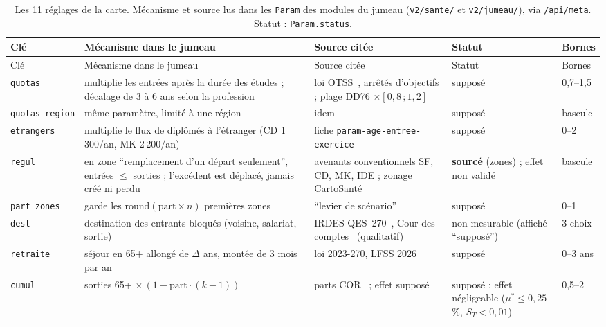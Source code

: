 \begin{small}
\begin{longtable}{@{}p{}p{}p{}p{}p{}@{}}
\caption{Les 11 réglages de la carte. Mécanisme et source lus dans les \texttt{Param} des modules du jumeau (\texttt{v2/\allowbreak{}sante/\allowbreak{}} et \texttt{v2/\allowbreak{}jumeau/\allowbreak{}}), via \texttt{/\allowbreak{}api/\allowbreak{}meta}. Statut : \texttt{Param.status}.}\label{pro:tab-leviers}\\
\toprule Clé & Mécanisme dans le jumeau & Source citée & Statut & Bornes \\ \midrule\endfirsthead
\toprule Clé & Mécanisme dans le jumeau & Source citée & Statut & Bornes \\ \midrule\endhead
\bottomrule\endfoot
\texttt{quotas} & multiplie les entrées après la durée des études ; décalage de 3 à 6\suppose{} ans selon la profession & loi OTSS~\citep{e-loiotss2019}, arrêtés d'objectifs ; plage DD76 $\times[0{,}8\,;1{,}2]$\suppose{}~\citep{e-dd76} & supposé & 0,7--1,5\mesure{} \\
\texttt{quotas\_\allowbreak{}region} & même paramètre, limité à une région & idem & supposé & bascule \\
\texttt{etrangers} & multiplie le flux de diplômés à l'étranger (CD 1\,300\suppose{}/an, MK 2\,200\suppose{}/an) & fiche \texttt{param-\allowbreak{}age-\allowbreak{}entree-\allowbreak{}exercice} & supposé & 0--2\mesure{} \\
\texttt{regul} & en zone \enquote{remplacement d'un départ seulement}, entrées $\leq$ sorties ; l'excédent est déplacé, jamais créé ni perdu & avenants conventionnels SF, CD, MK, IDE ; zonage CartoSanté~\citep{e-cartosante2026} & \textbf{sourcé} (zones) ; effet non validé & bascule \\
\texttt{part\_\allowbreak{}zones} & garde les $\mathrm{round}(\text{part}\times n)$ premières zones & \enquote{levier de scénario} & supposé & 0--1\mesure{} \\
\texttt{dest} & destination des entrants bloqués (voisine, salariat, sortie) & IRDES QES~270~\citep{e-irdes270}, Cour des comptes~\citep{e-ccomptes2024} (qualitatif) & non mesurable (affiché \enquote{supposé}) & 3\mesure{} choix \\
\texttt{retraite} & séjour en 65+ allongé de $\Delta$ ans, montée de 3\mesure{} mois par an & loi 2023-270, LFSS 2026 & supposé & 0--3\mesure{} ans \\
\texttt{cumul} & sorties 65+ $\times\,(1-\text{part}\cdot(k-1))$ & parts COR~\citep{e-cor2016} ; effet supposé & supposé ; effet négligeable ($\mu^\ast\leq 0{,}25$\mesure{}\,\%, $S_T<0{,}01$\mesure{}) & 0,5--2\mesure{} \\

\end{longtable}
\end{small}
